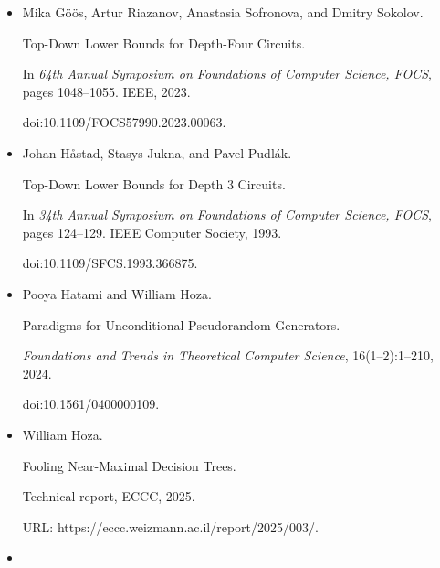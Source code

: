 \begin{itemize}
Mika Göös, Pritish Kamath, Toniann Pitassi, and Thomas Watson.


Query-to-Communication Lifting for $\textsf{P}^{\textsf{NP}}$.


\emph{Computational Complexity}, 28(1):113–144, 2019.





\item[] 
[11]

Mika Göös, Artur Riazanov, Anastasia Sofronova, and Dmitry Sokolov.


Top-Down Lower Bounds for Depth-Four Circuits.


In \emph{64th Annual Symposium on Foundations of Computer Science,
FOCS}, pages 1048–1055. IEEE, 2023.


doi:10.1109/FOCS57990.2023.00063.





\item[] 
[12]

Johan Håstad, Stasys Jukna, and Pavel Pudlák.


Top-Down Lower Bounds for Depth $3$ Circuits.


In \emph{34th Annual Symposium on Foundations of Computer Science,
FOCS}, pages 124–129. IEEE Computer Society, 1993.


doi:10.1109/SFCS.1993.366875.





\item[] 
[13]

Pooya Hatami and William Hoza.


Paradigms for Unconditional Pseudorandom Generators.


\emph{Foundations and Trends in Theoretical Computer Science},
16(1–2):1–210, 2024.


doi:10.1561/0400000109.





\item[] 
[14]

William Hoza.


Fooling Near-Maximal Decision Trees.


Technical report, ECCC, 2025.


URL: https://eccc.weizmann.ac.il/report/2025/003/.





\item[] 
[15]


\end{itemize}
